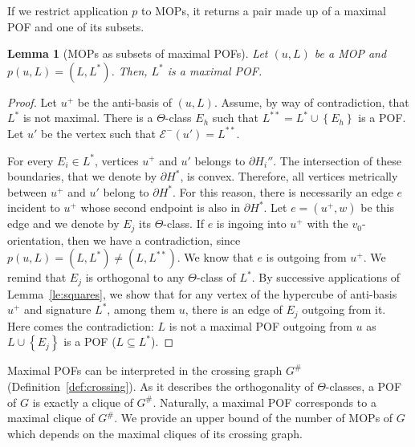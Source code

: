 \documentclass{article}
\newtheorem{lemma}{Lemma}
\newcommand{\set}[1]{\left\{ #1 \right\}}
\begin{document}
If we restrict application $p$ to MOPs, it returns a pair made up of a maximal POF and one of its subsets.

\begin{lemma}[MOPs as subsets of maximal POFs]
Let $(u,L)$ be a MOP and $p(u,L) = (L,L^*)$. Then, $L^*$ is a maximal POF.
\end{lemma}
\begin{proof}
Let $u^+$ be the anti-basis of $(u,L)$. 
Assume, by way of contradiction, that $L^*$ is not maximal. There is a $\Theta$-class $E_h$ such that $L^{**} = L^* \cup \set{E_h}$ is a POF. Let $u'$ be the vertex such that $\mathcal{E}^-(u') = L^{**}$.

For every $E_i \in L^*$, vertices $u^+$ and $u'$ belongs to $\partial H_i''$. The intersection of these boundaries, that we denote by $\partial H^*$, is convex. Therefore, all vertices metrically between $u^+$ and $u'$ belong to $\partial H^*$. For this reason, there is necessarily an edge $e$ incident to $u^+$ whose second endpoint is also in $\partial H^*$. Let $e=(u^+,w)$ be this edge and we denote by $E_j$ its $\Theta$-class. If $e$ is ingoing into $u^+$ with the $v_0$-orientation, then we have a contradiction, since $p(u,L) = (L,L^*) \neq (L,L^{**})$. We know that $e$ is outgoing from $u^+$. We remind that $E_j$ is orthogonal to any $\Theta$-class of $L^*$. By successive applications of Lemma~\ref{le:squares}, we show that for any vertex of the hypercube of anti-basis $u^+$ and signature $L^*$, among them $u$, there is an edge of $E_j$ outgoing from it. Here comes the contradiction: $L$ is not a maximal POF outgoing from $u$ as $L \cup \set{E_j}$ is a POF ($L \subseteq L^*$).
\end{proof}

Maximal POFs can be interpreted in the crossing graph $G^{\#}$ (Definition~\ref{def:crossing}). As it describes the orthogonality of $\Theta$-classes, a POF of $G$ is exactly a clique of $G^{\#}$. Naturally, a maximal POF corresponds to a maximal clique of $G^{\#}$. We provide an upper bound of the number of MOPs of $G$ which depends on the maximal cliques of its crossing graph.
\end{document}

